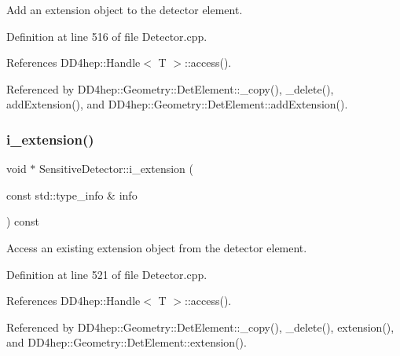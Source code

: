 Add an extension object to the detector element. 



Definition at line 516 of file Detector.\+cpp.



References D\+D4hep\+::\+Handle$<$ T $>$\+::access().



Referenced by D\+D4hep\+::\+Geometry\+::\+Det\+Element\+::\+\_\+copy(), \+\_\+delete(), add\+Extension(), and D\+D4hep\+::\+Geometry\+::\+Det\+Element\+::add\+Extension().

\hypertarget{class_d_d4hep_1_1_geometry_1_1_sensitive_detector_af2f80a3cb9d0222a2b6ec5e67e220777}{}\label{class_d_d4hep_1_1_geometry_1_1_sensitive_detector_af2f80a3cb9d0222a2b6ec5e67e220777} 
\subsubsection{\texorpdfstring{i\+\_\+extension()}{i\_extension()}}
{\footnotesize\ttfamily void $\ast$ Sensitive\+Detector\+::i\+\_\+extension (\begin{DoxyParamCaption}\item[{const std\+::type\+\_\+info \&}]{info }\end{DoxyParamCaption}) const\hspace{0.3cm}{\ttfamily [protected]}}



Access an existing extension object from the detector element. 



Definition at line 521 of file Detector.\+cpp.



References D\+D4hep\+::\+Handle$<$ T $>$\+::access().



Referenced by D\+D4hep\+::\+Geometry\+::\+Det\+Element\+::\+\_\+copy(), \+\_\+delete(), extension(), and D\+D4hep\+::\+Geometry\+::\+Det\+Element\+::extension().

\hypertarget{class_d_d4hep_1_1_geometry_1_1_sensitive_detector_afc33394fa07a926f2707681a66b291df}{}\label{class_d_d4hep_1_1_geometry_1_1_sensitive_detector_afc33394fa07a926f2707681a66b291df} 

